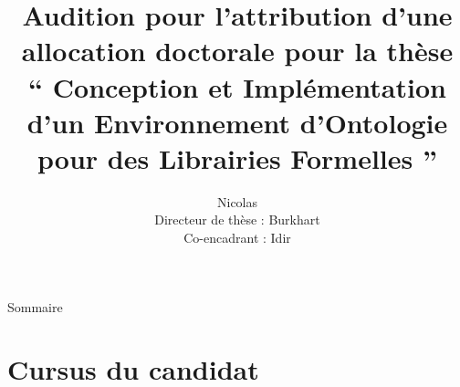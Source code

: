 \documentclass[
  hyperref={
    pdfusetitle,
    pdfencoding=auto,
    psdextra,
    colorlinks=true,
    linkcolor=darkblue,
    citecolor=darkred,
    urlcolor=darkblue,
  },
  9pt,
  aspectratio=169,
]{beamer}
\title{%
  Audition pour l'attribution d'une allocation doctorale pour la thèse%
  \texorpdfstring{\\}{}
  \texorpdfstring{%
  \enquote{%
    Conception et Implémentation d'un Environnement d'Ontologie
    pour des Librairies Formelles%
  }%
  }{%
    Conception et Implémentation d'un Environnement d'Ontologie
    pour des Librairies Formelles%
  }%
}
\author{%
  {\Large Nicolas \texorpdfstring{\bsc{Méric}}{Méric}}%
  \texorpdfstring{\\}{}
  Directeur de thèse : Burkhart \texorpdfstring{\bsc{Wolff}}{Wolff}%
  \texorpdfstring{\\}{}
  Co-encadrant : Idir \texorpdfstring{\bsc{Aït Sadoune}}{Aït Sadoune}%
}
\date{\frenchdate{2020}{06}{11}}
\begin{document}

\begin{frame}
  \titlepage{}
\end{frame}

\begin{frame}{Sommaire}
  \tableofcontents[hideallsubsections]{}
\end{frame}

\section{Cursus du candidat}
\end{document}
